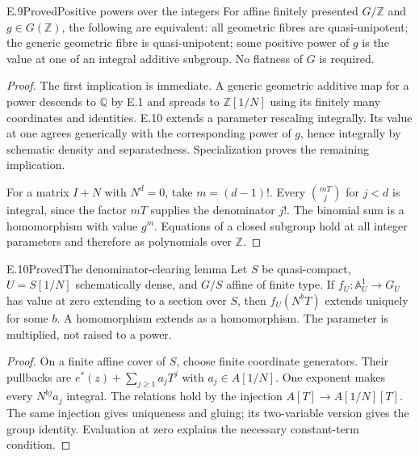 \begin{statement}{E.9}{Proved}{Positive powers over the integers}
For affine finitely presented $G/\mathbb Z$ and
$g\in G(\mathbb Z)$, the following are equivalent:
all geometric fibres are quasi-unipotent; the generic
geometric fibre is quasi-unipotent; some positive power
of $g$ is the value at one of an integral additive subgroup.
No flatness of $G$ is required.
\end{statement}
\begin{proof}
The first implication is immediate.
A generic geometric additive map for a power descends
to $\mathbb Q$ by E.1 and spreads to $\mathbb Z[1/N]$
using its finitely many coordinates and identities.
E.10 extends a parameter rescaling integrally.
Its value at one agrees generically with the corresponding
power of $g$, hence integrally by schematic density
and separatedness. Specialization proves the remaining
implication.

For a matrix $I+N$ with $N^d=0$, take $m=(d-1)!$.
Every $\binom{mT}{j}$ for $j<d$ is integral, since the
factor $mT$ supplies the denominator $j!$.
The binomial sum is a homomorphism with value $g^m$.
Equations of a closed subgroup hold at all integer
parameters and therefore as polynomials over $\mathbb Z$.
\end{proof}

\begin{statement}{E.10}{Proved}{The denominator-clearing lemma}
Let $S$ be quasi-compact, $U=S[1/N]$ schematically dense,
and $G/S$ affine of finite type.
If $f_U:\mathbb A^1_U\to G_U$ has value at zero extending
to a section over $S$, then $f_U(N^bT)$ extends uniquely
for some $b$. A homomorphism extends as a homomorphism.
The parameter is multiplied, not raised to a power.
\end{statement}
\begin{proof}
On a finite affine cover of $S$, choose finite coordinate
generators. Their pullbacks are
$e^*(z)+\sum_{j\ge1}a_jT^j$ with $a_j\in A[1/N]$.
One exponent makes every $N^{bj}a_j$ integral.
The relations hold by the injection $A[T]\to A[1/N][T]$.
The same injection gives uniqueness and gluing;
its two-variable version gives the group identity.
Evaluation at zero explains the necessary constant-term
condition.
\end{proof}

